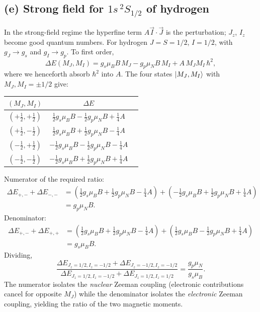 \documentclass[11pt]{article}
\begin{document}
\subsection*{(e) Strong field for $1s\,{}^2S_{1/2}$ of hydrogen}

In the strong-field regime the hyperfine term $A\vec I\cdot\vec J$ is the perturbation; $J_z$, $I_z$ become good quantum numbers. For hydrogen $J=S=1/2$, $I=1/2$, with $g_J\to g_s$ and $g_I\to g_p$. To first order,
\begin{equation*}
    \Delta E(M_J,M_I) = g_s\mu_B B\,M_J - g_p\mu_N B\,M_I + A\,M_J M_I\,\hbar^2,
\end{equation*}
where we henceforth absorb $\hbar^2$ into $A$. The four states $\ket{M_J,M_I}$ with $M_J,M_I=\pm 1/2$ give:

\begin{center}
\begin{tabular}{@{}ccc@{}}\toprule
$(M_J,M_I)$ & $\Delta E$ \\ \midrule
$(+\tfrac12,+\tfrac12)$ & $\tfrac12 g_s\mu_B B-\tfrac12 g_p\mu_N B+\tfrac14 A$ \\
$(+\tfrac12,-\tfrac12)$ & $\tfrac12 g_s\mu_B B+\tfrac12 g_p\mu_N B-\tfrac14 A$ \\
$(-\tfrac12,+\tfrac12)$ & $-\tfrac12 g_s\mu_B B-\tfrac12 g_p\mu_N B-\tfrac14 A$ \\
$(-\tfrac12,-\tfrac12)$ & $-\tfrac12 g_s\mu_B B+\tfrac12 g_p\mu_N B+\tfrac14 A$ \\
\bottomrule
\end{tabular}
\end{center}

Numerator of the required ratio:
\begin{align*}
    \Delta E_{+,-}+\Delta E_{-,-} &= \left(\tfrac12 g_s\mu_B B+\tfrac12 g_p\mu_N B-\tfrac14 A\right) + \left(-\tfrac12 g_s\mu_B B+\tfrac12 g_p\mu_N B+\tfrac14 A\right) \\
    &= g_p\mu_N B.
\end{align*}
Denominator:
\begin{align*}
    \Delta E_{+,-}+\Delta E_{+,+} &= \left(\tfrac12 g_s\mu_B B+\tfrac12 g_p\mu_N B-\tfrac14 A\right) + \left(\tfrac12 g_s\mu_B B-\tfrac12 g_p\mu_N B+\tfrac14 A\right) \\
    &= g_s\mu_B B.
\end{align*}
Dividing,
\begin{equation*}
    \boxed{\;\frac{\Delta E_{J_z=1/2,I_z=-1/2}+\Delta E_{J_z=-1/2,I_z=-1/2}}{\Delta E_{J_z=1/2,I_z=-1/2}+\Delta E_{J_z=1/2,I_z=1/2}} = \frac{g_p\mu_N}{g_s\mu_B}.\;}
\end{equation*}
The numerator isolates the \emph{nuclear} Zeeman coupling (electronic contributions cancel for opposite $M_J$) while the denominator isolates the \emph{electronic} Zeeman coupling, yielding the ratio of the two magnetic moments.
\end{document}
